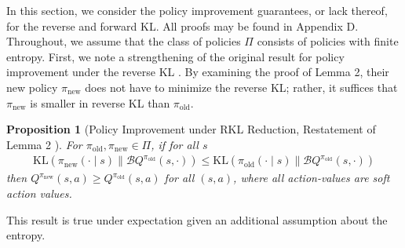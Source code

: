 \documentclass[twoside,11pt]{article}
\newcommand{\KL}{\mathrm{KL}}
\newcommand{\boltzmannQ}{\mathcal{B}Q}
\newcommand{\pinew}{{\pi_\mathrm{new}}}
\newcommand{\piold}{{\pi_\mathrm{old}}}
\newtheorem{proposition}{Proposition}
\begin{document}
In this section, we consider the policy improvement guarantees, or lack thereof, for the reverse and forward KL. %
All proofs may be found in Appendix D. 
Throughout, we assume that the class of policies $\Pi$ consists of policies with finite entropy. First, we note a strengthening of the original result for policy improvement under the reverse KL \citep{haarnoja2018soft}. By examining the proof of Lemma 2, their new policy $\pi_{\mathrm{new}}$ does not have to minimize the reverse KL; rather, it suffices that $\pi_{\mathrm{new}}$ is smaller in reverse KL than $\pi_{\mathrm{old}}$. 
\begin{proposition}[Policy Improvement under RKL Reduction, Restatement of Lemma 2 \citep{haarnoja2018soft}]\label{lem:stronger-sac}
For $\piold, \pinew \in \Pi$, if for all $s$
\begin{align*}
    \KL(\pinew(\cdot \mid s) \parallel \boltzmannQ^\piold(s, \cdot)) \le \KL(\piold(\cdot \mid s) \parallel \boltzmannQ^\piold(s, \cdot))\nonumber
\end{align*}
then $Q^\pinew(s, a) \geq Q^\piold(s, a)$ for all $(s, a)$, where all action-values are soft action values. 
\end{proposition}

This result is true under expectation given an additional assumption about the entropy.
\end{document}
